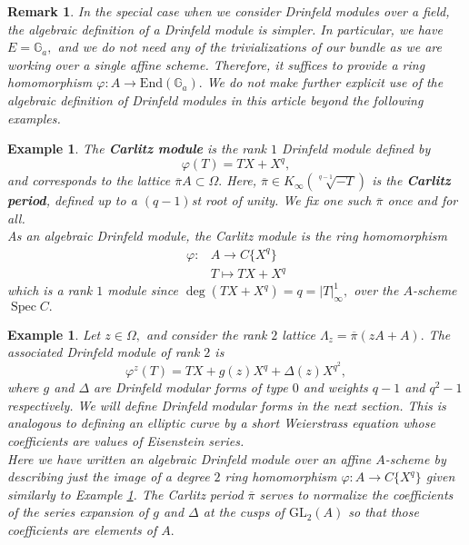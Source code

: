 \documentclass[11pt]{amsart}
\newtheorem{example}[theorem]{Example}
\newtheorem{remark}[theorem]{Remark}
\theoremstyle{definition}
\numberwithin{equation}{section}
\newcommand{\GL}{\mathrm{GL}} 	%
\newcommand{\End}{\mathrm{End}} 	%
\newcommand{\Spec}{\operatorname{Spec}} 	%
\newcommand{\bbG}{\mathbb{G}}		%
\begin{document}
		\begin{remark}
			In the special case when we consider Drinfeld modules over a field, the algebraic definition of a Drinfeld module is simpler. In particular, we have $E=\bbG_a,$ and we do not need any of the trivializations of our bundle as we are working over a single affine scheme. Therefore, it suffices to provide a ring homomorphism $\varphi: A\to \End(\bbG_a).$ We do not make further explicit use of the algebraic definition of Drinfeld modules in this article beyond the following examples.
		\end{remark}
		
		\begin{example}\cite{Carlitz-class-of-poly}\label{ex: Carlitz module}
			The \textbf{Carlitz module} is the rank $1$ Drinfeld module defined by \[\varphi(T)=TX+X^q,\] and corresponds to the lattice $\overline{\pi}A\subset \Omega.$ Here, $\overline{\pi}\in K_{\infty}(\sqrt[q-1]{-T})$ is the \textbf{Carlitz period}, defined up to a $(q-1)$st root of unity. We fix one such $\overline{\pi}$ once and for all.\\
			
			As an algebraic Drinfeld module, the Carlitz module is the ring homomorphism 
			\begin{align*}
				\varphi: &A\to C\{X^q\}\\
				&T\mapsto TX+X^q 
			\end{align*}
			which is a rank $1$ module since $\deg (TX+X^q)=q=|T|_{\infty}^1,$ over the $A$-scheme $\Spec C.$ 
		\end{example}
		
		\begin{example}
			Let $z\in \Omega,$ and consider the rank $2$ lattice $\Lambda_z=\overline{\pi}(zA+A).$ The associated Drinfeld module of rank $2$ is 
			\[\varphi^z(T)=TX+g(z)X^q+\Delta(z)X^{q^2},\]
			where $g$ and $\Delta$ are Drinfeld modular forms of type $0$ and weights $q-1$ and $q^2-1$ respectively. We will define Drinfeld modular forms in the next section. This is analogous to defining an elliptic curve by a short Weierstrass equation whose coefficients are values of Eisenstein series.\\
			
			Here we have written an algebraic Drinfeld module over an affine $A$-scheme by describing just the image of a degree $2$ ring homomorphism $\varphi: A\to C\{X^q\}$ given similarly to Example \ref{ex: Carlitz module}. The Carlitz period $\overline{\pi}$ serves to normalize the coefficients of the series expansion of $g$ and $\Delta$ at the cusps of $\GL_2(A)$ so that those coefficients are elements of $A.$
		\end{example}
		
\end{document}
